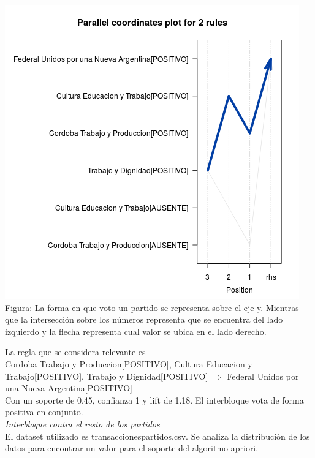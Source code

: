 \documentclass{endm}
\begin{document}
\begin{center}
\includegraphics[scale=0.4]{graficos/paracoordFr.png} \\
\scriptsize{Figura: La forma en que voto un partido se representa sobre el eje y. Mientras que la intersección sobre  los números representa que se encuentra del lado izquierdo y la flecha representa cual valor se ubica en el lado derecho.} \\
\end{center} 

La regla que se considera relevante es \\

{Cordoba Trabajo y Produccion[POSITIVO], Cultura Educacion y Trabajo[POSITIVO], Trabajo y Dignidad[POSITIVO]} $\Longrightarrow$ {Federal Unidos por una Nueva Argentina[POSITIVO]} \\

Con un soporte de 0.45, confianza 1 y lift de 1.18. El interbloque vota de forma positiva en conjunto. \\

\textit{Interbloque contra el resto de los partidos} \\

El dataset utilizado es transaccionespartidos.csv. Se analiza la distribución de los datos para encontrar un valor para el soporte del algoritmo apriori. \\
\end{document}
